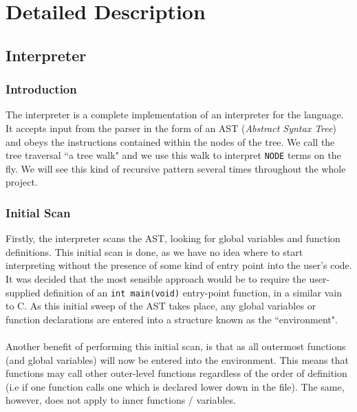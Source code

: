 \chapter{Detailed Description}
\section{Interpreter}
\subsection{Introduction}
The interpreter is a complete implementation of an interpreter for the \mmc language. It accepts input from the parser in the form of an AST (\emph{Abstract Syntax Tree}) and obeys the instructions contained within the nodes of the tree. We call the tree traversal ``a tree walk" and we use this walk to interpret \verb!NODE! terms on the fly. We will see this kind of recursive pattern several times throughout the whole project.
\subsection{Initial Scan}
Firstly, the interpreter scans the AST, looking for global variables and function definitions. This initial scan is done, as we have no idea where to start interpreting without the presence of some kind of entry point into the user's code. It was decided that the most sensible approach would be to require the user-supplied definition of an \verb!int main(void)! entry-point function, in a similar vain to C. As this initial sweep of the AST takes place, any global variables or function declarations are entered into a structure known as the ``environment". 
\ \\ \ \\
Another benefit of performing this initial scan, is that as all outermost functions (and global variables) will now be entered into the environment. This means that functions may call other outer-level functions regardless of the order of definition (i.e if one function calls one which is declared lower down in the file). The same, however, does not apply to inner functions / variables.
